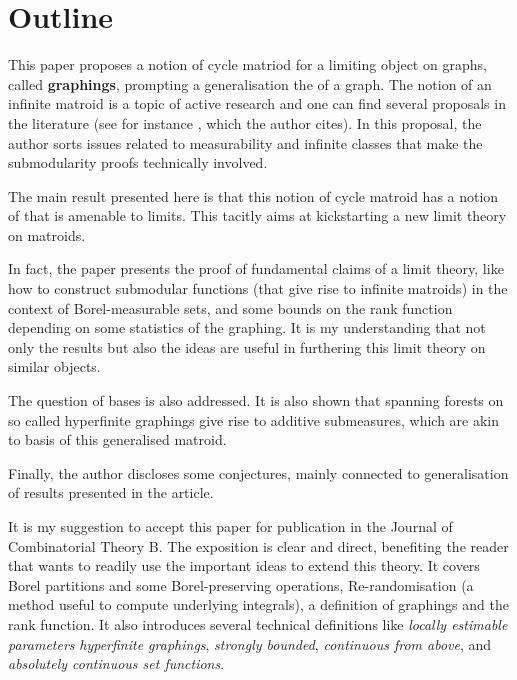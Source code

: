 \documentclass[12pt]{article}
\begin{document}
\maketitle




\section*{Outline}

This paper proposes a notion of cycle matriod for a  limiting object on graphs, called \textbf{graphings}, prompting a generalisation the  of a graph.
The notion of an infinite matroid is a topic of active research and one can find several proposals in the literature (see for instance \cite{bruhn2013axioms}, which the author cites).
In this proposal, the author sorts issues related to measurability and infinite classes that make the submodularity proofs technically involved.

The main result presented here is that this notion of cycle matroid has a notion of  that is amenable to limits.
This tacitly aims at kickstarting a new limit theory on matroids.

In fact, the paper presents the proof of fundamental claims of a limit theory, like how to construct submodular functions (that give rise to infinite matroids) in the context of Borel-measurable sets, and some bounds on the rank function depending on some statistics of the graphing.
It is my understanding that not only the results but also the ideas are useful in furthering this limit theory on similar objects.

The question of bases is also addressed.
It is also shown that spanning forests on so called hyperfinite graphings give rise to additive submeasures, which are akin to basis of this generalised matroid.

Finally, the author discloses some conjectures, mainly connected to generalisation of results presented in the article.

It is my suggestion to accept this paper for publication in the Journal of Combinatorial Theory B.
The exposition is clear and direct, benefiting the reader that wants to readily use the important ideas to extend this theory.
It covers Borel partitions and some Borel-preserving operations, Re-randomisation (a method useful to compute underlying integrals), a definition of graphings and the rank function.
It also introduces several technical definitions like \textit{locally estimable parameters} \textit{hyperfinite graphings}, \textit{strongly bounded}, \textit{continuous from above}, and \textit{absolutely continuous set functions}.
\end{document}
